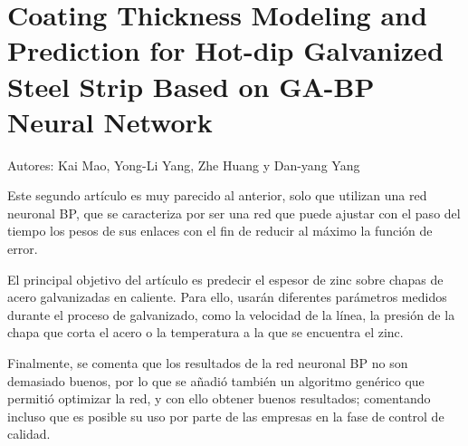 \section{Coating Thickness Modeling and Prediction for Hot-dip Galvanized Steel Strip Based on GA-BP Neural Network}
Autores: Kai Mao, Yong-Li Yang, Zhe Huang y Dan-yang Yang

Este segundo artículo \cite{9164854} es muy parecido al anterior, solo que utilizan una red neuronal BP, que se caracteriza por ser una red que puede ajustar con el paso del tiempo los pesos de sus enlaces con el fin de reducir al máximo la función de error.

El principal objetivo del artículo es predecir el espesor de zinc sobre chapas de acero galvanizadas en caliente. Para ello, usarán diferentes parámetros medidos durante el proceso de galvanizado, como la velocidad de la línea, la presión de la chapa que corta el acero o la temperatura a la que se encuentra el zinc.

Finalmente, se comenta que los resultados de la red neuronal BP no son demasiado buenos, por lo que se añadió también un algoritmo genérico que permitió optimizar la red, y con ello obtener buenos resultados; comentando incluso que es posible su uso por parte de las empresas en la fase de control de calidad.

